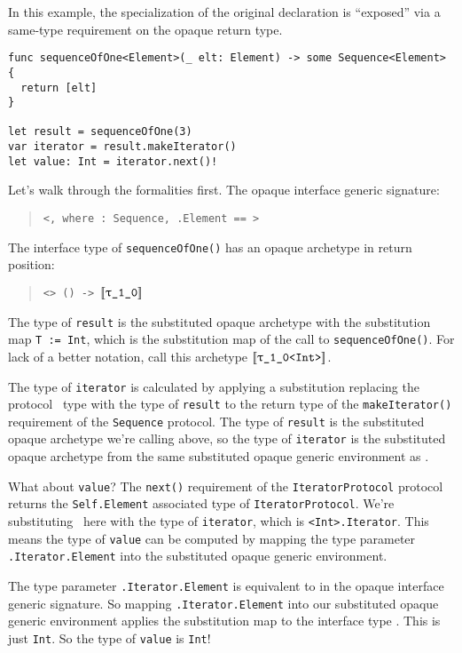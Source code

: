 \documentclass[../generics]{subfiles}
\begin{document}
\begin{example}
In this example, the specialization of the original declaration is ``exposed'' via a same-type requirement on the opaque return type.
\begin{Verbatim}
func sequenceOfOne<Element>(_ elt: Element) -> some Sequence<Element> {
  return [elt]
}

let result = sequenceOfOne(3)
var iterator = result.makeIterator()
let value: Int = iterator.next()!
\end{Verbatim}
Let's walk through the formalities first. The opaque interface generic signature:
\begin{quote}
\texttt{<,  where :\ Sequence, .Element == >}
\end{quote}
The interface type of \texttt{sequenceOfOne()} has an opaque archetype in return position:
\begin{quote}
\texttt{<> () -> $\archetype{\ttgp{1}{0}}$}
\end{quote}
The type of \texttt{result} is the substituted opaque archetype with the substitution map \texttt{T := Int}, which is the substitution map of the call to \texttt{sequenceOfOne()}. For lack of a better notation, call this archetype $\archetype{\ttgp{1}{0}<Int>}$.

\IndexSelf
The type of \texttt{iterator} is calculated by applying a substitution replacing the protocol \tSelf\ type with the type of \texttt{result} to the return type of the \texttt{makeIterator()} requirement of the \texttt{Sequence} protocol. The type of \texttt{result} is the substituted opaque archetype we're calling  above, so the type of \texttt{iterator} is the substituted opaque archetype  from the same substituted opaque generic environment as .

What about \texttt{value}? The \texttt{next()} requirement of the \texttt{IteratorProtocol} protocol returns the \texttt{Self.Element} associated type of \texttt{IteratorProtocol}. We're substituting \tSelf\ here with the type of \texttt{iterator}, which is \texttt{<Int>.Iterator}. This means the type of \texttt{value} can be computed by mapping the type parameter \texttt{.Iterator.Element} into the substituted opaque generic environment.

The type parameter \texttt{.Iterator.Element} is equivalent to \texttt{} in the opaque interface generic signature. So mapping \texttt{.Iterator.Element} into our substituted opaque generic environment applies the substitution map to the interface type \texttt{}. This is just \texttt{Int}. So the type of \texttt{value} is \texttt{Int}!
\end{example}
\end{document}
